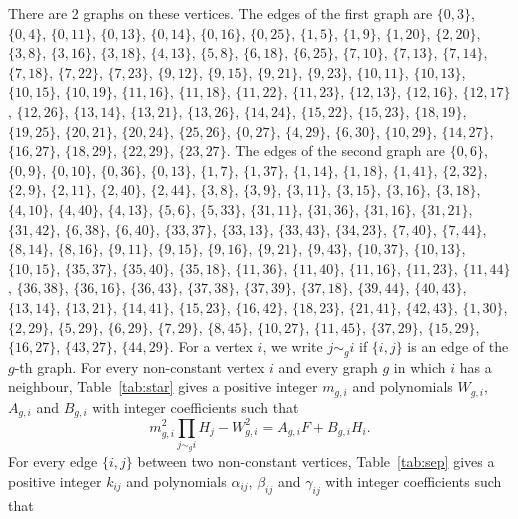 \documentclass[11pt]{article}
\begin{document}
There are 2 graphs on these vertices. The edges of the first graph are $\{0,3\}$, $\{0,4\}$, $\{0,11\}$, $\{0,13\}$, $\{0,14\}$, $\{0,16\}$, $\{0,25\}$, $\{1,5\}$, $\{1,9\}$, $\{1,20\}$, $\{2,20\}$, $\{3,8\}$, $\{3,16\}$, $\{3,18\}$, $\{4,13\}$, $\{5,8\}$, $\{6,18\}$, $\{6,25\}$, $\{7,10\}$, $\{7,13\}$, $\{7,14\}$, $\{7,18\}$, $\{7,22\}$, $\{7,23\}$, $\{9,12\}$, $\{9,15\}$, $\{9,21\}$, $\{9,23\}$, $\{10,11\}$, $\{10,13\}$, $\{10,15\}$, $\{10,19\}$, $\{11,16\}$, $\{11,18\}$, $\{11,22\}$, $\{11,23\}$, $\{12,13\}$, $\{12,16\}$, $\{12,17\}$, $\{12,26\}$, $\{13,14\}$, $\{13,21\}$, $\{13,26\}$, $\{14,24\}$, $\{15,22\}$, $\{15,23\}$, $\{18,19\}$, $\{19,25\}$, $\{20,21\}$, $\{20,24\}$, $\{25,26\}$, $\{0,27\}$, $\{4,29\}$, $\{6,30\}$, $\{10,29\}$, $\{14,27\}$, $\{16,27\}$, $\{18,29\}$, $\{22,29\}$, $\{23,27\}$. The edges of the second graph are $\{0,6\}$, $\{0,9\}$, $\{0,10\}$, $\{0,36\}$, $\{0,13\}$, $\{1,7\}$, $\{1,37\}$, $\{1,14\}$, $\{1,18\}$, $\{1,41\}$, $\{2,32\}$, $\{2,9\}$, $\{2,11\}$, $\{2,40\}$, $\{2,44\}$, $\{3,8\}$, $\{3,9\}$, $\{3,11\}$, $\{3,15\}$, $\{3,16\}$, $\{3,18\}$, $\{4,10\}$, $\{4,40\}$, $\{4,13\}$, $\{5,6\}$, $\{5,33\}$, $\{31,11\}$, $\{31,36\}$, $\{31,16\}$, $\{31,21\}$, $\{31,42\}$, $\{6,38\}$, $\{6,40\}$, $\{33,37\}$, $\{33,13\}$, $\{33,43\}$, $\{34,23\}$, $\{7,40\}$, $\{7,44\}$, $\{8,14\}$, $\{8,16\}$, $\{9,11\}$, $\{9,15\}$, $\{9,16\}$, $\{9,21\}$, $\{9,43\}$, $\{10,37\}$, $\{10,13\}$, $\{10,15\}$, $\{35,37\}$, $\{35,40\}$, $\{35,18\}$, $\{11,36\}$, $\{11,40\}$, $\{11,16\}$, $\{11,23\}$, $\{11,44\}$, $\{36,38\}$, $\{36,16\}$, $\{36,43\}$, $\{37,38\}$, $\{37,39\}$, $\{37,18\}$, $\{39,44\}$, $\{40,43\}$, $\{13,14\}$, $\{13,21\}$, $\{14,41\}$, $\{15,23\}$, $\{16,42\}$, $\{18,23\}$, $\{21,41\}$, $\{42,43\}$, $\{1,30\}$, $\{2,29\}$, $\{5,29\}$, $\{6,29\}$, $\{7,29\}$, $\{8,45\}$, $\{10,27\}$, $\{11,45\}$, $\{37,29\}$, $\{15,29\}$, $\{16,27\}$, $\{43,27\}$, $\{44,29\}$. For a vertex $i$, we write $j\sim_g i$ if $\{i,j\}$ is an edge of the $g$-th graph.
For every non-constant vertex $i$ and every graph $g$ in which $i$ has a neighbour, Table~\ref{tab:star} gives a positive integer $m_{g,i}$ and polynomials $W_{g,i}$, $A_{g,i}$ and $B_{g,i}$ with integer coefficients such that
\begin{equation}\label{eq:star}
m_{g,i}^2\prod_{j\sim_g i}H_j-W_{g,i}^2=A_{g,i}F+B_{g,i}H_i.
\end{equation}
For every edge $\{i,j\}$ between two non-constant vertices, Table~\ref{tab:sep} gives a positive integer $k_{ij}$ and polynomials $\alpha_{ij}$, $\beta_{ij}$ and $\gamma_{ij}$ with integer coefficients such that
\end{document}
